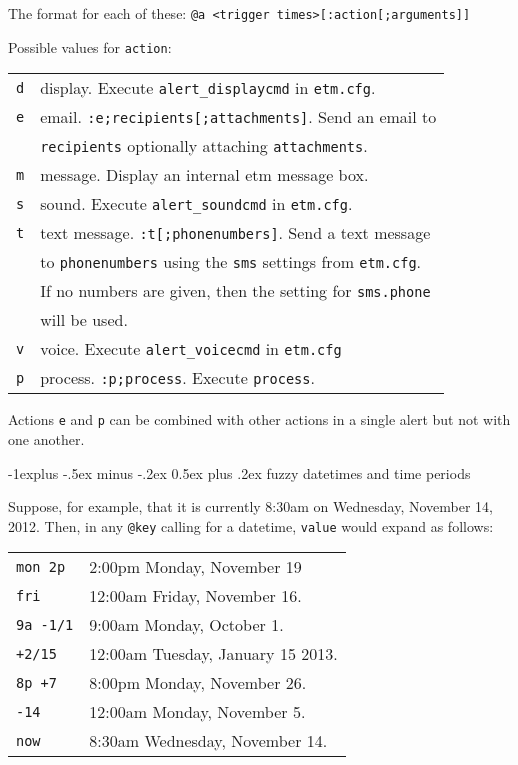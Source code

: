 \documentclass[10pt,landscape]{article}
\makeatletter
\renewcommand{\subsection}{\@startsection{subsection}{2}{0mm}%
                                {-1explus -.5ex minus -.2ex}%
                                {0.5ex plus .2ex}%
                                {\normalfont\normalsize\bfseries}}
\makeatother
\begin{document}
\begin{multicols}{3}
The format for each of these:
\vskip 3pt
\texttt{@a <trigger times>[:action[;arguments]]}
\vskip 3pt

Possible values for \verb!action!:
\vskip 3pt

\begin{tabular}{@{}ll@{}}
\texttt{d} & display. Execute \verb!alert_displaycmd! in \verb!etm.cfg!. \\
\texttt{e} & email. \verb!:e;recipients[;attachments]!. Send an email to \\
           & \verb!recipients! optionally attaching \verb!attachments!.\\
\texttt{m} & message. Display an internal etm message box. \\
\texttt{s} & sound. Execute \verb!alert_soundcmd! in \verb!etm.cfg!. \\
\texttt{t} & text message. \verb!:t[;phonenumbers]!. Send a text message \\
           & to \verb'phonenumbers' using the \verb'sms' settings from \verb'etm.cfg'. \\
           & If no numbers are given, then the setting for \verb'sms.phone' \\
           & will be used. \\
\texttt{v} & voice. Execute \verb!alert_voicecmd! in \verb!etm.cfg! \\
\texttt{p} & process. \verb!:p;process!. Execute \verb!process!.  \\
\end{tabular}

\vskip 3pt

Actions \verb!e! and \verb!p! can be combined with other actions in a single alert but not with one another.


\subsection{fuzzy datetimes and time periods}

Suppose, for example, that it is currently 8:30am on Wednesday, November 14, 2012. Then, in any \verb!@key! calling for a datetime, \verb!value! would expand as follows:
\vskip 3pt

\begin{tabular}{@{}ll@{}}
\texttt{mon 2p} & 2:00pm Monday, November 19 \\
\texttt{fri} & 12:00am Friday, November 16. \\
\texttt{9a -1/1} & 9:00am Monday, October 1. \\
\texttt{+2/15} & 12:00am Tuesday, January 15 2013. \\
\texttt{8p +7} & 8:00pm Monday, November 26.\\
\texttt{-14} & 12:00am Monday, November 5. \\
\texttt{now} & 8:30am Wednesday, November 14. \\
\end{tabular}


\end{multicols}
\end{document}
